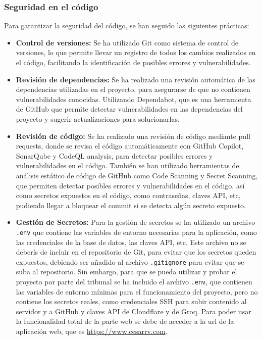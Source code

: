\subsubsection{Seguridad en el código}
Para garantizar la seguridad del código, se han seguido las siguientes prácticas:
\begin{itemize}
    \item \textbf{Control de versiones:} Se ha utilizado Git como sistema de control de versiones, lo que permite llevar un registro de todos los cambios realizados en el código, facilitando la identificación de posibles errores y vulnerabilidades.
    \item \textbf{Revisión de dependencias:} Se ha realizado una revisión automática de las dependencias utilizadas en el proyecto, para asegurarse de que no contienen vulnerabilidades conocidas. Utilizando Dependabot, que es una herramienta de GitHub que permite detectar vulnerabilidades en las dependencias del proyecto y sugerir actualizaciones para solucionarlas.

    \item \textbf{Revisión de código:} Se ha realizado una revisión de código mediante pull requests, donde se revisa el código automáticamente con GitHub Copilot, SonarQube y CodeQL analysis, para detectar posibles errores y vulnerabilidades en el código.
    También se han utilizado herramientas de análisis estático de código de GitHub como Code Scanning y Secret Scanning, que permiten detectar posibles errores y vulnerabilidades en el código, así como secretos expuestos en el código, como contraseñas, claves API, etc, pudiendo llegar a bloquear el commit si se detecta algún secreto expuesto.

    \item \textbf{Gestión de Secretos:} Para la gestión de secretos se ha utilizado un archivo \texttt{.env} que contiene las variables de entorno necesarias para la aplicación, como las credenciales de la base de datos, las claves API, etc. Este archivo no se deberís de incluir en el repositorio de Git, para evitar que los secretos queden expuestos, debiendo ser añadido al archivo \texttt{.gitignore} para evitar que se suba al repositorio. Sin embargo, para que se pueda utilizar y probar el proyecto por parte del tribunal se ha incluido el archivo \texttt{.env}, que contienen las variables de entorno mínimas para el funcionamiento del proyecto, pero no contiene los secretos reales, como credenciales SSH para subir contenido al servidor y a GitHub y claves API de Cloudflare y de Groq. Para poder usar la funcionalidad total de la parte web se debe de acceder a la url de la aplicación web, que es \url{https://www.cesarrv.com}.
\end{itemize}

